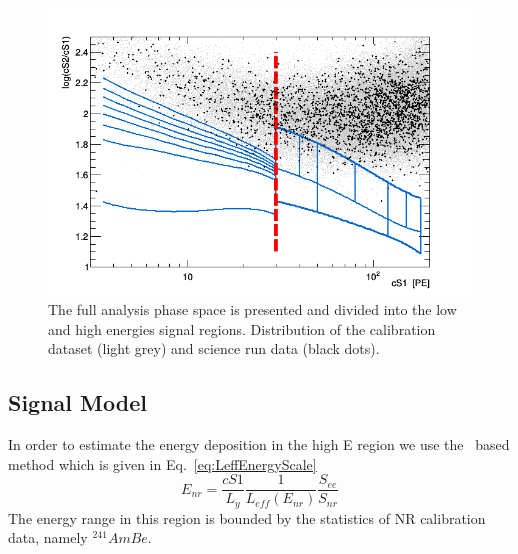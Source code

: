 \begin{figure}[t]
\centerline{\includegraphics[width=1.\linewidth]{Figures/eft_sr.png}}
\caption{The full analysis phase space is presented and divided into the low and high energies signal regions. Distribution of the calibration dataset (light grey) and science run data (black dots). 
}
\label{fig:phasespace}
\end{figure}  




\subsection{Signal Model}
\label{subsec:SignalModel}
In order to estimate the energy deposition in the high E region we use the \Leff\ based method which is given in Eq.~\ref{eq:LeffEnergyScale}
\begin{equation}
\label{eq:LeffEnergyScale}
	E_{nr} = \frac{cS1}{L_y} \frac{1}{L_{eff}(E_{nr})} \frac{S_{ee}}{S_{nr}}
\end{equation}
The energy range in this region is bounded by the statistics of NR calibration data, namely $^{241}AmBe$.

